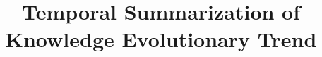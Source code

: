 \documentclass{sig-alternate}
\newcommand{\hide}[1]{} %
\begin{document}

\title{Temporal Summarization of Knowledge Evolutionary Trend}

%

\hide{
\author{
\alignauthor Yutao Zhang\\
	\affaddr{Department of Computer Science}\\
	\affaddr{Tsinghua University}\\
	\affaddr{Beijing 100084, China}\\
	\email{stack@live.cn}
\alignauthor Jie Tang\\
	\affaddr{Department of Computer Science}\\
	\affaddr{Tsinghua University}\\
	\affaddr{Beijing 100084, China}\\
	\email{jietang@tsinghua.edu.cn}
}

}

\maketitle














\end{document}
